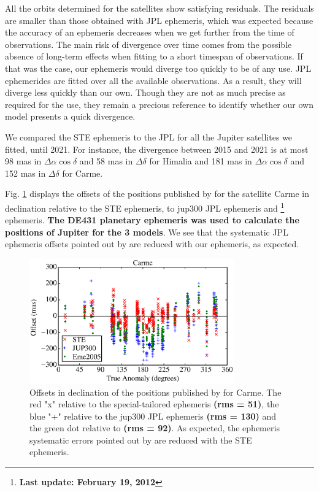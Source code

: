 \documentclass[useAMS,usenatbib]{mn2e}
\begin{document}
All the orbits determined for the satellites show satisfying residuals. The residuals are smaller than those obtained with JPL ephemeris, which was expected because the accuracy of an ephemeris decreases when we get further from the time of observations. The main risk of divergence over time comes from the possible absence of long-term effects when fitting to a short timespan of observations. If that was the case, our ephemeris would diverge too quickly to be of any use. JPL ephemerides are fitted over all the available observations. As a result, they will diverge less quickly than our own. Though they are not as much precise as required for the use, they remain a precious reference to identify whether our own model presents a quick divergence.

We compared the STE ephemeris to the JPL for all the Jupiter satellites we fitted, until 2021. For instance, the divergence between 2015 and 2021 is at most 98 mas in $\Delta \alpha \cos \delta$ and 58 mas in $\Delta \delta$ for Himalia and 181 mas in $\Delta \alpha \cos \delta$ and 152 mas in $\Delta \delta$ for Carme.

Fig. \ref{Fig: JPL-STE} displays the offsets of the positions published by  for the satellite Carme in declination relative to the STE ephemeris, to \cite{Jacobson2012} jup300 JPL ephemeris and \cite{Emelyanov2005}\footnote{\textbf{Last update: February 19, 2012}} ephemeris. \textbf{The DE431 planetary ephemeris \citep{Folkner2014} was used to calculate the positions of Jupiter for the 3 models}. We see that the systematic JPL ephemeris offsets pointed out by  are reduced with our ephemeris, as expected.

\begin{figure}
\includegraphics[width=8.8cm]{figures/Carme_ephemeris.eps}
\caption{Offsets in declination of the positions published by \protect{} for Carme. The red "x" relative to the special-tailored ephemeris \textbf{(rms = 51)}, the blue "+" relative to the jup300 JPL ephemeris \textbf{(rms = 130)} and the green dot relative to \protect\cite{Emelyanov2005} \textbf{(rms = 92)}. As expected, the ephemeris systematic errors pointed out by \protect{} are reduced with the STE ephemeris. \label{Fig: JPL-STE}}
\end{figure}
\end{document}
